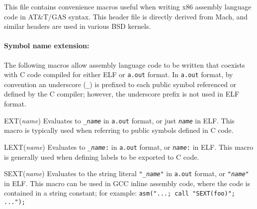 \begin{apisyn}
\end{apisyn}
\begin{apidesc}
	This file contains convenience macros
	useful when writing x86 assembly language code in AT\&T/GAS syntax.
	This header file is directly derived from Mach,
	and similar headers are used in various BSD kernels.

	\paragraph{Symbol name extension:}
	The following macros allow assembly language code to be written
	that coexists with C code compiled for either ELF or {\tt a.out} format.
	In {\tt a.out} format,
	by convention an underscore ({\tt _}) is prefixed
	to each public symbol referenced or defined by the C compiler;
	however, the underscore prefix is not used in ELF format.
	\begin{csymlist}
	\item[EXT(\emph{name})]		
		Evaluates to {\tt _\emph{name}} in {\tt a.out} format,
		or just {\tt\emph{name}} in ELF\@.
		This macro is typically used
		when referring to public symbols defined in C code.
	\item[LEXT(\emph{name})]		
		Evaluates to {\tt _\emph{name}:} in {\tt a.out} format,
		or {\tt \emph{name}:} in ELF\@.
		This macro is generally used
		when defining labels to be exported to C code.
	\item[SEXT(\emph{name})]		
		Evaluates to the string literal
		{\tt "_\emph{name}"} in {\tt a.out} format,
		or {\tt "\emph{name}"} in ELF\@.
		This macro can be used in GCC inline assembly code,
		where the code is contained in a string constant;
		for example:
		{\tt asm("...; call "SEXT(foo)"; ...");}
	\end{csymlist}


\end{apidesc}

